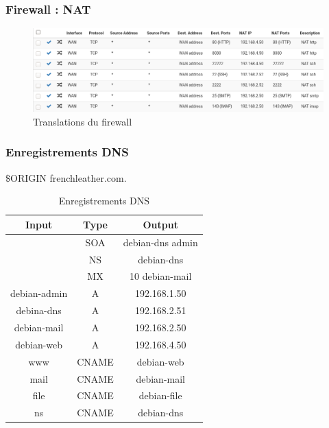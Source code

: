 \documentclass{beamer}
\begin{document}
		\begin{frame}
			\frametitle{Firewall : NAT}
			\begin{center}
				\begin{figure}
					\includegraphics[scale=.3]{nat.png}
					\caption{Translations du firewall}
				\end{figure}
			\end{center}
		\end{frame}
		\begin{frame}
			\frametitle{Enregistrements DNS}
			$\$$ORIGIN frenchleather.com.
			\begin{center}
				\begin{table}[h!]
					\centering
					\begin{tabular}{||c c c||}
						\hline
						Input & Type & Output \\
						\hline\hline
						 & SOA & debian-dns admin \\
						 & NS & debian-dns \\
						 & MX & 10 debian-mail \\
						debian-admin & A & 192.168.1.50 \\
						debina-dns & A & 192.168.2.51 \\
						debian-mail & A & 192.168.2.50 \\
						debian-web & A & 192.168.4.50 \\
						www & CNAME & debian-web \\
						mail & CNAME & debian-mail \\
						file & CNAME & debian-file \\
						ns & CNAME & debian-dns \\
						\hline
					\end{tabular}
					\caption{Enregistrements DNS}
					\label{table:1}
					\end{table}
			\end{center}
		\end{frame}
\end{document}
